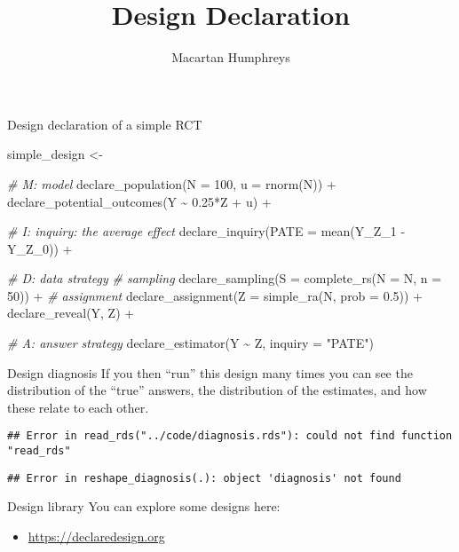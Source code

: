 \documentclass[
  11pt,
  ignorenonframetext,
]{beamer}
\title{Design Declaration}
\author{Macartan Humphreys}
\date{}
\newenvironment{Shaded}{\begin{snugshade}}{\end{snugshade}}
\newcommand{\AttributeTok}[1]{\textcolor[rgb]{0.77,0.63,0.00}{#1}}
\newcommand{\CommentTok}[1]{\textcolor[rgb]{0.56,0.35,0.01}{\textit{#1}}}
\newcommand{\DecValTok}[1]{\textcolor[rgb]{0.00,0.00,0.81}{#1}}
\newcommand{\FloatTok}[1]{\textcolor[rgb]{0.00,0.00,0.81}{#1}}
\newcommand{\FunctionTok}[1]{\textcolor[rgb]{0.00,0.00,0.00}{#1}}
\newcommand{\NormalTok}[1]{#1}
\newcommand{\OtherTok}[1]{\textcolor[rgb]{0.56,0.35,0.01}{#1}}
\newcommand{\SpecialCharTok}[1]{\textcolor[rgb]{0.00,0.00,0.00}{#1}}
\newcommand{\StringTok}[1]{\textcolor[rgb]{0.31,0.60,0.02}{#1}}
\providecommand{\tightlist}{%
  \setlength{\itemsep}{0pt}\setlength{\parskip}{0pt}}
\begin{document}
\frame{\titlepage}

\begin{frame}[fragile]{Design declaration of a simple RCT}
\protect\hypertarget{design-declaration-of-a-simple-rct}{}
\begin{Shaded}
\begin{Highlighting}[]
\NormalTok{simple\_design }\OtherTok{\textless{}{-}} 
  
  \CommentTok{\# M: model}
  \FunctionTok{declare\_population}\NormalTok{(}\AttributeTok{N =} \DecValTok{100}\NormalTok{, }\AttributeTok{u =} \FunctionTok{rnorm}\NormalTok{(N)) }\SpecialCharTok{+}
  \FunctionTok{declare\_potential\_outcomes}\NormalTok{(Y }\SpecialCharTok{\textasciitilde{}} \FloatTok{0.25}\SpecialCharTok{*}\NormalTok{Z }\SpecialCharTok{+}\NormalTok{ u) }\SpecialCharTok{+}
  
  \CommentTok{\# I: inquiry: the average effect}
  \FunctionTok{declare\_inquiry}\NormalTok{(}\AttributeTok{PATE =} \FunctionTok{mean}\NormalTok{(Y\_Z\_1 }\SpecialCharTok{{-}}\NormalTok{ Y\_Z\_0)) }\SpecialCharTok{+}
  
  \CommentTok{\# D: data strategy}
  \CommentTok{\# sampling}
  \FunctionTok{declare\_sampling}\NormalTok{(}\AttributeTok{S =} \FunctionTok{complete\_rs}\NormalTok{(}\AttributeTok{N =}\NormalTok{ N, }\AttributeTok{n =} \DecValTok{50}\NormalTok{)) }\SpecialCharTok{+}       
  \CommentTok{\# assignment}
  \FunctionTok{declare\_assignment}\NormalTok{(}\AttributeTok{Z =} \FunctionTok{simple\_ra}\NormalTok{(N, }\AttributeTok{prob =} \FloatTok{0.5}\NormalTok{)) }\SpecialCharTok{+} 
  \FunctionTok{declare\_reveal}\NormalTok{(Y, Z) }\SpecialCharTok{+}
  
  \CommentTok{\# A: answer strategy}
  \FunctionTok{declare\_estimator}\NormalTok{(Y }\SpecialCharTok{\textasciitilde{}}\NormalTok{ Z, }\AttributeTok{inquiry =} \StringTok{"PATE"}\NormalTok{)}
\end{Highlighting}
\end{Shaded}
\end{frame}

\begin{frame}[fragile]{Design diagnosis}
\protect\hypertarget{design-diagnosis}{}
If you then ``run'' this design many times you can see the distribution
of the ``true'' answers, the distribution of the estimates, and how
these relate to each other.

\begin{verbatim}
## Error in read_rds("../code/diagnosis.rds"): could not find function "read_rds"
\end{verbatim}

\begin{verbatim}
## Error in reshape_diagnosis(.): object 'diagnosis' not found
\end{verbatim}
\end{frame}

\begin{frame}{Design library}
\protect\hypertarget{design-library}{}
You can explore some designs here:

\begin{itemize}
\tightlist
\item
  \url{https://declaredesign.org}
\end{itemize}
\end{frame}
\end{document}
